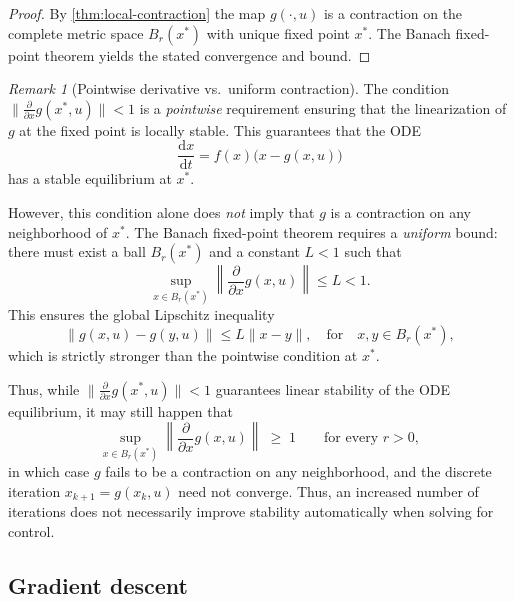 \documentclass[11pt,twoside]{article}
\theoremstyle{plain}
\theoremstyle{definition}
\theoremstyle{remark}
\newtheorem{remark}{Remark}
\begin{document}
\begin{proof}
By \cref{thm:local-contraction} the map \(g(\cdot,u)\) is a contraction on the complete metric space \(B_r(x^*)\) with unique fixed point \(x^*\). The Banach fixed-point theorem yields the stated convergence and bound.
\end{proof}

\begin{remark}[Pointwise derivative vs.\ uniform contraction]
The condition \(\|\frac{\partial}{\partial x} g(x^*,u)\| < 1\) is a \emph{pointwise} requirement ensuring that the
linearization of \(g\) at the fixed point is locally stable.  
This guarantees that the ODE 
\[
    \frac{\mathrm{d}x}{\mathrm{d}t} = f(x)\bigl(x-g(x,u)\bigr)
\]
has a stable equilibrium at \(x^*\).

However, this condition alone does \emph{not} imply that \(g\) is a contraction on any neighborhood of
\(x^*\).  The Banach fixed-point theorem requires a \emph{uniform} bound: there must exist a ball
\(B_r(x^*)\) and a constant \(L<1\) such that
\[
    \sup_{x\in B_r(x^*)} \left\|\frac{\partial}{\partial x} g(x,u)\right\| \le L < 1.
\]
This ensures the global Lipschitz inequality
\[
    \|g(x,u)-g(y,u)\| \le L \|x-y\|,\quad \text{for} \quad x,y\in B_r(x^*),
\]
which is strictly stronger than the pointwise condition at \(x^*\).

Thus, while \(\|\frac{\partial}{\partial x} g(x^*,u)\| < 1\) guarantees linear stability of the ODE equilibrium, it may
still happen that
\[
    \sup_{x \in B_r(x^*)} \left\|\frac{\partial}{\partial x} g(x,u)\right\| \;\ge\; 1
    \qquad\text{for every } r>0,
\]
in which case \(g\) fails to be a contraction on any neighborhood, and the discrete iteration
\(x_{k+1}=g(x_k,u)\) need not converge. Thus, an increased number of iterations does not necessarily improve stability automatically when solving for control.
\end{remark}



\subsection{Gradient descent} 
\end{document}
